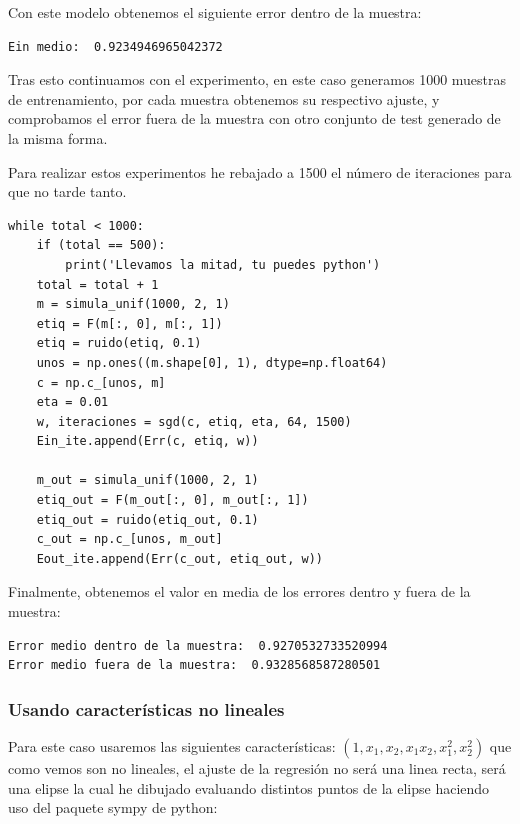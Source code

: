 \documentclass[12pt, spanish]{article}
\begin{document}
Con este modelo obtenemos el siguiente error dentro de la muestra:

\begin{lstlisting}
Ein medio:  0.9234946965042372
\end{lstlisting}

Tras esto continuamos con el experimento, en este caso generamos 1000 muestras de entrenamiento, por cada muestra obtenemos su respectivo ajuste, y comprobamos el error fuera de la muestra con otro conjunto de test generado de la misma forma.

Para realizar estos experimentos he rebajado a 1500 el número de iteraciones para que no tarde tanto.

\newpage

\begin{lstlisting}
while total < 1000:
	if (total == 500):
		print('Llevamos la mitad, tu puedes python')
	total = total + 1
	m = simula_unif(1000, 2, 1)
	etiq = F(m[:, 0], m[:, 1])
	etiq = ruido(etiq, 0.1)
	unos = np.ones((m.shape[0], 1), dtype=np.float64)
	c = np.c_[unos, m]
	eta = 0.01
	w, iteraciones = sgd(c, etiq, eta, 64, 1500)
	Ein_ite.append(Err(c, etiq, w))

	m_out = simula_unif(1000, 2, 1)
	etiq_out = F(m_out[:, 0], m_out[:, 1])
	etiq_out = ruido(etiq_out, 0.1)
	c_out = np.c_[unos, m_out]
	Eout_ite.append(Err(c_out, etiq_out, w))
\end{lstlisting}

Finalmente, obtenemos el valor en media de los errores dentro y fuera de la muestra:

\begin{lstlisting}
Error medio dentro de la muestra:  0.9270532733520994
Error medio fuera de la muestra:  0.9328568587280501
\end{lstlisting}

\newpage

\subsubsection{Usando características no lineales}



Para este caso usaremos las siguientes características: $(1, x_1, x_2, x_1x_2, x_1^2, x_2^2)$ que como vemos son no lineales, el ajuste de la regresión no será una linea recta, será una elipse la cual he dibujado evaluando distintos puntos de la elipse haciendo uso del paquete sympy\cite{documentacion-sympy} de python:
\end{document}
